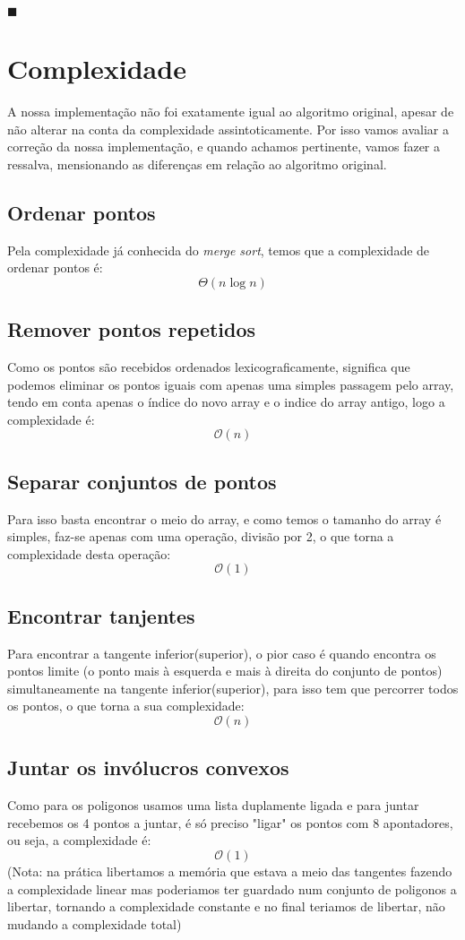 \documentclass[11pt]{article}
\begin{document}
\hfill $\blacksquare$


\section{Complexidade}
A nossa implementação não foi exatamente igual ao algoritmo original,
apesar de não alterar na conta da complexidade assintoticamente.
Por isso vamos avaliar a correção da nossa implementação, e quando 
achamos pertinente, vamos fazer a ressalva, mensionando as diferenças 
em relação ao algoritmo original.

\subsection{Ordenar pontos}
Pela complexidade já conhecida do \textit{merge sort}, 
temos que a complexidade de ordenar pontos é:
$$\Theta(n\log{}n)$$

\subsection{Remover pontos repetidos}
Como os pontos são recebidos ordenados lexicograficamente,
significa que podemos eliminar os pontos iguais com apenas
uma simples passagem pelo array, tendo em conta apenas o 
índice do novo array e o indice do array antigo, logo a 
complexidade é:
$$\mathcal{O}(n)$$

\subsection{Separar conjuntos de pontos}
Para isso basta encontrar o meio do array,
e como temos o tamanho do array é simples, faz-se apenas com uma operação,
divisão por 2, o que torna a complexidade desta operação:
$$\mathcal{O}(1)$$

\subsection{Encontrar tanjentes}
Para encontrar a tangente inferior(superior),
o pior caso é quando encontra os pontos limite
(o ponto mais à esquerda e mais à direita do conjunto de pontos) 
simultaneamente na tangente inferior(superior), 
para isso tem que percorrer todos os pontos,
o que torna a sua complexidade: 
$$\mathcal{O}(n)$$

\subsection{Juntar os invólucros convexos}
Como para os poligonos usamos uma lista duplamente ligada e
para juntar recebemos os 4 pontos a juntar, é só preciso 
"ligar" os pontos com 8 apontadores, ou seja, a complexidade é: 
$$\mathcal{O}(1)$$
(Nota: na prática libertamos a memória que estava 
a meio das tangentes fazendo a complexidade linear
mas poderiamos ter guardado num conjunto de poligonos 
a libertar, tornando a complexidade constante e no final 
teriamos de libertar, não mudando a complexidade total)
\end{document}
